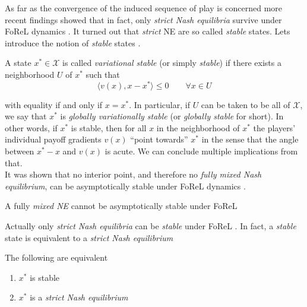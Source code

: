As far as the convergence of the induced sequence of play is concerned more recent findings showed that in fact, only \textit{strict Nash equilibria} survive under FoReL dynamics \cite{flokas}. It turned out that \textit{strict} NE are so called \textit{stable} states. Lets introduce the notion of \textit{stable} states \cite[Def. 2.3]{mertikopoulos}. 

\begin{definition}\label{def:stability}
    A state $x^* \in \mathcal{X}$ is called \textit{variational stable} (or simply \textit{stable}) if there exists a neighborhood $U$ of $x^*$ such that 
    \[\langle v(x),x-x^*\rangle \le 0 \qquad \forall x \in U\]
\end{definition}

with equality if and only if $x = x^*$. In particular, if $U$ can be taken to be all of $\mathcal{X}$, we say that $x^*$ is \textit{globally variationally stable} (or \textit{globally stable} for short). In other words, if $x^*$ is stable, then for all $x$ in the neighborhood of $x^*$ the players’ individual payoff gradients $v(x)$ “point towards” $x^*$ in the sense that the angle between $x^* - x$ and $v(x)$ is acute. We can conclude multiple implications from that.\\

It was shown that no interior point, and therefore no \textit{fully mixed Nash equilibrium}, can be asymptotically stable under FoReL dynamics \cite[Theorem 1]{flokas}. 

\begin{proposition}\label{prop:noInteriorStable}
    A fully \textit{mixed NE} cannot be asymptotically stable under FoReL
\end{proposition}

Actually only \textit{strict Nash equilibria} can be \textit{stable} under FoReL \cite[Theorem 2]{flokas}. In fact, a \textit{stable} state is equivalent to a \textit{strict Nash equilibrium} \cite[Prop. 5.2]{mertikopoulos}

\begin{proposition}\label{prop:StrictStableEquivalent}
    The following are equivalent
    \begin{enumerate}
        \item $x^*$ is stable
        \item $x^*$ is a \textit{strict Nash equilibrium}
    \end{enumerate}
\end{proposition}
    

